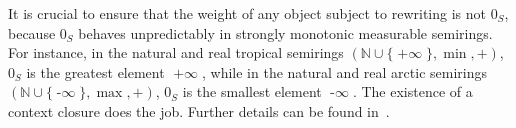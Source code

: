 It is crucial to ensure that the weight of any object subject to rewriting is not $0_S$, because \(0_S\) behaves unpredictably in strongly monotonic measurable semirings. For instance, in the natural and real tropical semirings \((\mathbb{N} \mathop{\cup} \{\mathop{+\infty}\}, \mathop{\min}, +)\), \(0_S\) is the greatest element \(\mathop{+\infty}\), while in the natural and real arctic semirings \((\mathbb{N} \mathop{\cup} \{\mathop{-\infty}\}, \max, +)\), \(0_S\) is the smallest element \(\mathop{-\infty}\).
The existence of a context closure does the job. Further details can be found in~\cite[]{endrullis2024generalized}.


